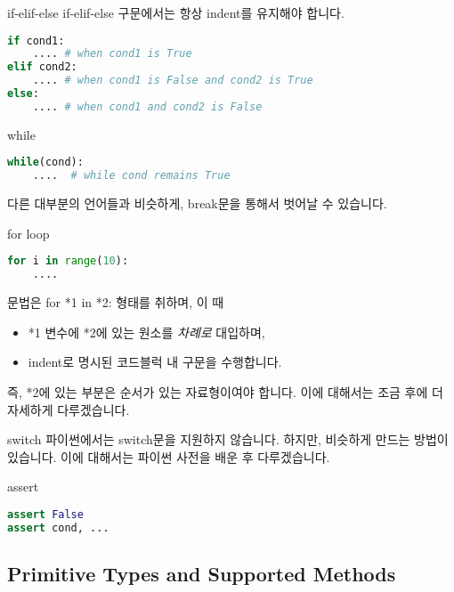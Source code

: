 \documentclass{beamer}
\begin{document}
\begin{frame}[fragile]{if-elif-else}
if-elif-else 구문에서는 항상 indent를 유지해야 합니다. 
\begin{lstlisting}[language=Python]
if cond1:
    .... # when cond1 is True
elif cond2:    
    .... # when cond1 is False and cond2 is True 
else:
    .... # when cond1 and cond2 is False
\end{lstlisting}

\end{frame}


\begin{frame}[fragile]{while}
\begin{lstlisting}[language=Python]
while(cond):
    ....  # while cond remains True
\end{lstlisting}

다른 대부분의 언어들과 비슷하게, break문을 통해서 벗어날 수 있습니다. 
\end{frame}

\begin{frame}[fragile]{for loop}
\begin{lstlisting}[language=Python]
for i in range(10):
    ....
\end{lstlisting}

문법은 for *1 in *2: 형태를 취하며, 이 때 
\begin{itemize}
\item *1 변수에 *2에 있는 원소를 \textit{차례로} 대입하며, 
\item indent로 명시된 코드블럭 내 구문을 수행합니다. 
\end{itemize}

즉, *2에 있는 부분은 순서가 있는 자료형이여야 합니다. 이에 대해서는 조금 후에 더 자세하게 다루겠습니다. 

\end{frame}

\begin{frame}[fragile]{switch}
파이썬에서는 switch문을 지원하지 않습니다. 하지만, 비슷하게 만드는 방법이 있습니다. 이에 대해서는 파이썬 사전을 배운 후 다루겠습니다. 
\end{frame}

\begin{frame}[fragile]{assert}
\begin{lstlisting}[language=Python]
assert False
assert cond, ...
\end{lstlisting}
\end{frame}

\subsection{Primitive Types and Supported Methods} 
\end{document}
